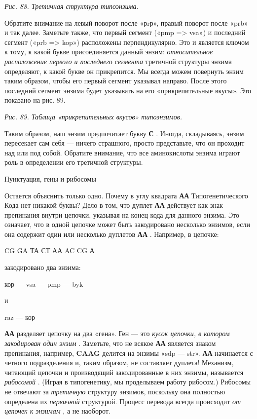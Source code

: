 \emph{Рис. 88. Третичная структура типоэнзима.}

Обратите внимание на левый поворот после «рrр», правый поворот после «prb» и так далее. Заметьте также, что первый сегмент («pmp =\textgreater{} vsa») и последний сегмент («prb =\textgreater{} kop») расположены перпендикулярно. Это и является ключом к тому, к какой букве присоединяется данный энзим: \emph{относительное расположение первого и последнего сегмента} третичной структуры энзима определяют, к какой букве он прикрепится. Мы всегда можем повернуть энзим таким образом, чтобы его первый сегмент указывал направо. После этого последний сегмент энзима будет указывать на его «прикрепительные вкусы». Это показано на рис. 89.

\emph{Рис. 89. Таблица «прикрепительных вкусов» типоэнзимов.}

Таким образом, наш энзим предпочитает букву \textbf{С} . Иногда, складываясь, энзим пересекает сам себя --- ничего страшного, просто представьте, что он проходит над или под собой. Обратите внимание, что все аминокислоты энзима играют роль в определении его третичной структуры.

Пунктуация, гены и рибосомы

Остается объяснить только одно. Почему в углу квадрата \textbf{АА} Типогенетического Кода нет никакой буквы? Дело в том, что дуплет \textbf{АА} действует как знак препинания внутри цепочки, указывая на конец кода для данного энзима. Это означает, что в одной цепочке может быть закодировано несколько энзимов, если она содержит один или несколько дуплетов \textbf{АА} . Например, в цепочке:

CG GA ТА СТ АА AC CG А

закодировано два энзима:

кор --- vsa --- pmp --- byk

и

raz --- кор

\textbf{АА} разделяет цепочку на два «гена». Ген --- это \emph{кусок цепочки, в котором закодирован один энзим} . Заметьте, что не всякое \textbf{АА} является знаком препинания, например, \textbf{CAAG} делится на энзимы «sdp --- str». \textbf{АА} начинается с четного подразделения и, таким образом, не составляет дуплета! Механизм, читающий цепочки и производящий закодированные в них энзимы, называется \emph{рибосомой} . (Играя в типогенетику, мы проделываем работу рибосом.) Рибосомы не отвечают за \emph{третичную} структуру энзимов, поскольку она полностью определена их \emph{первичной} структурой. Процесс перевода всегда происходит \emph{от цепочек к энзимам} , а не наоборот.

